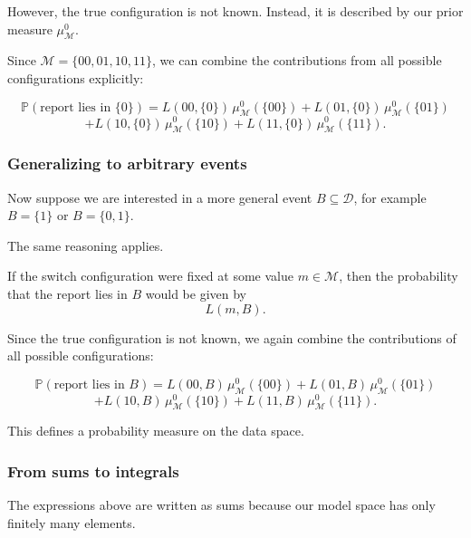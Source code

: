 \documentclass[11pt]{article}
\theoremstyle{remark}
\newcommand{\modelspace}{\mathcal{M}}
\newcommand{\dataspace}{\mathcal{D}}
\begin{document}
However, the true configuration is not known. Instead, it is described by our prior measure \(\mu_{\modelspace}^0\).

\vspace{2mm}

Since \(\modelspace = \{00,01,10,11\}\), we can combine the contributions from all possible configurations explicitly:

\[
\mathbb P(\text{report lies in } \{0\})
=
L(00,\{0\})\,\mu_{\modelspace}^0(\{00\})
+
L(01,\{0\})\,\mu_{\modelspace}^0(\{01\})
\]
\[
+
L(10,\{0\})\,\mu_{\modelspace}^0(\{10\})
+
L(11,\{0\})\,\mu_{\modelspace}^0(\{11\}).
\]

\vspace{2mm}

\subsubsection{Generalizing to arbitrary events}

Now suppose we are interested in a more general event \(B \subseteq \dataspace\), for example \(B = \{1\}\) or \(B = \{0,1\}\).

The same reasoning applies.

\vspace{2mm}

If the switch configuration were fixed at some value \(m \in \modelspace\), then the probability that the report lies in \(B\) would be given by
\[
L(m,B).
\]

Since the true configuration is not known, we again combine the contributions of all possible configurations:

\[
\mathbb P(\text{report lies in } B)
=
L(00,B)\,\mu_{\modelspace}^0(\{00\})
+
L(01,B)\,\mu_{\modelspace}^0(\{01\})
\]
\[
+
L(10,B)\,\mu_{\modelspace}^0(\{10\})
+
L(11,B)\,\mu_{\modelspace}^0(\{11\}).
\]

\vspace{2mm}

This defines a probability measure on the data space.

\vspace{2mm}

\subsubsection{From sums to integrals}

The expressions above are written as sums because our model space has only finitely many elements.
\end{document}
